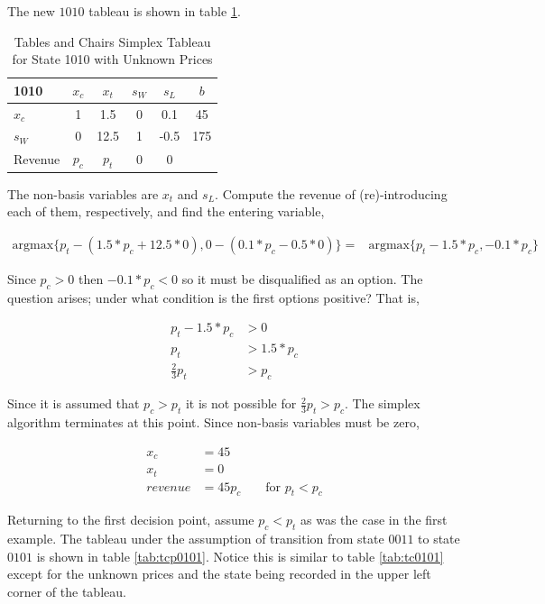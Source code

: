 The new $1010$ tableau is shown in table \ref{tab:tcp1010}.

\begin{table}
\centering
\begin{tabular}{| l | c c c c | c |}
\hline
1010    & $x_c$ & $x_t$ & $s_W$ & $s_L$ & $b$\\
\hline
$x_c$   & 1     & 1.5    & 0     & 0.1   & 45\\
$s_W$   & 0     & 12.5   & 1     & -0.5  & 175\\
\hline
Revenue & $p_c$ & $p_t$ & 0     & 0     &\\
\hline
\end{tabular}
  \caption[Tables and Chairs Simplex Tableau for State 1010 with Unknown Prices]
          {Tables and Chairs Simplex Tableau for State 1010 with Unknown Prices}
  \label{tab:tcp1010}
\end{table}

The non-basis variables are $x_t$ and $s_L$. Compute the revenue of (re)-introducing each of them, respectively, and find the entering variable,

\begin{align*}
   \text{argmax}\{p_t - (1.5*p_c + 12.5*0), 0 - (0.1*p_c - 0.5*0)\}
= &\text{argmax}\{p_t - 1.5*p_c , - 0.1*p_c\}
\end{align*}

Since $p_c > 0$ then $-0.1*p_c < 0$ so it must be disqualified as an option. The question arises; under what condition is the first options positive? That is,

\begin{align*}
p_t - 1.5*p_c &> 0\\
p_t &> 1.5*p_c\\
\frac{2}{3}p_t &> p_c
\end{align*}

Since it is assumed that $p_c > p_t$ it is not possible for $\frac{2}{3}p_t > p_c$. The simplex algorithm terminates at this point. Since non-basis variables must be zero,

\begin{align*}
x_c &= 45\\
x_t &= 0\\
revenue &= 45p_c && \text{ for } p_t < p_c
\end{align*}

Returning to the first decision point, assume $p_c < p_t$ as was the case in the first example. The tableau under the assumption of transition from state $0011$ to state $0101$ is shown in table \ref{tab:tcp0101}. Notice this is similar to table \ref{tab:tc0101} except for the unknown prices and the state being recorded in the upper left corner of the tableau.

